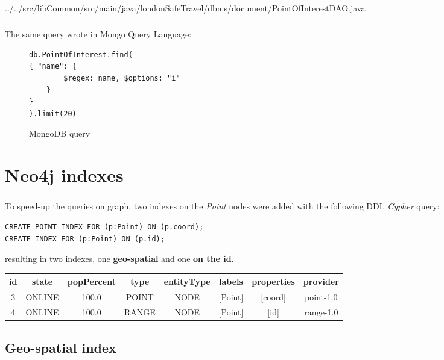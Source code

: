 
{../../src/libCommon/src/main/java/londonSafeTravel/dbms/document/PointOfInterestDAO.java}
\paragraph{}
The same query wrote in Mongo Query Language:
\begin{figure}[H]
	\begin{lstlisting}
db.PointOfInterest.find(
{ "name": {
		$regex: name, $options: "i"
	}
}
).limit(20)
	\end{lstlisting}
	\caption{MongoDB query}
\end{figure}


\chapter{Neo4j indexes}

\paragraph{}
To speed-up the queries on graph, two indexes on the \textit{Point} nodes were added with the following DDL \textit{Cypher} query:

\begin{lstlisting}
CREATE POINT INDEX FOR (p:Point) ON (p.coord);
CREATE INDEX FOR (p:Point) ON (p.id);
\end{lstlisting}

resulting in two indexes, one \textbf{geo-spatial} and one \textbf{on the id}.

\begin{tabular}{|c|c|c|c|c|c|c|c|}
	\hline
	
	id & state & popPercent & type & entityType & labels & properties & provider \\
	
	\hline
	\hline
	
	3 & ONLINE & 100.0 & POINT & NODE & [Point] & [coord] & point-1.0 \\
	
	\hline
	
	4 & ONLINE & 100.0 & RANGE & NODE & [Point] & [id] & range-1.0 \\
	
	\hline
\end{tabular}

\section{Geo-spatial index}

